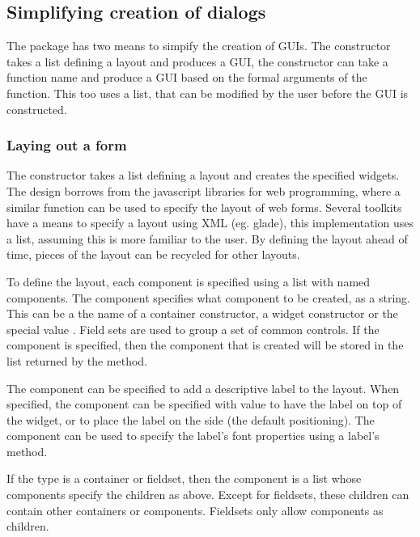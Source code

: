 \subsection{Simplifying creation of dialogs}
\label{sec:gWidgets-designing-forms}

The  package has two means to simpify the creation of
GUIs. The  constructor takes a list defining a
layout and produces a GUI, the  constructor can
take a function name and produce a GUI based on the formal arguments
of the function. This too uses a list, that can be modified by the
user before the GUI is constructed. 

\subsubsection{Laying out a form}
\label{sec:gWidgets-laying-out-form}

The  constructor takes a list defining a
layout and creates the specified widgets. The design borrows from the
 javascript libraries for web programming, where a similar
function can be used to specify the layout of web forms. Several
toolkits have a means to specify a layout using XML (eg. glade), this
implementation uses a list, assuming this is more familiar to the \R\/
user. By defining the layout ahead of time, pieces of the layout can
be recycled for other layouts.


To define the layout, each component is specified using a list with
named components. The component  specifies what component
to be created, as a string. This can be a the name of a container
constructor, a widget constructor or the special value
. Field sets are used to group a set of common
controls. If the component  is specified, then the
component that is created will be stored in the list returned by the
\code{[} method.

The  component can be specified to
add a descriptive label to the layout. When specified, the component
 can be specified with value  to have the label
on top of the widget, or  to place the label on the side
(the default positioning). The  component can be used
to specify the label's font properties using a label's  method.

If the type is a container or
fieldset, then the  component is a list whose
components specify the children as above. Except for fieldsets, these
children can contain other containers or components. Fieldsets only
allow components as children.

